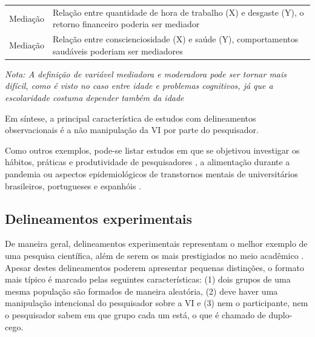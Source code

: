 \documentclass[
]{book}
\begin{document}
\begin{longtable}[]{@{}ll@{}}
\begin{minipage}[t]{0.10\columnwidth}\raggedright
Mediação\strut
\end{minipage} & \begin{minipage}[t]{0.84\columnwidth}\raggedright
Relação entre quantidade de hora de trabalho (X) e desgaste (Y), o retorno financeiro poderia ser mediador\strut
\end{minipage}\tabularnewline
\begin{minipage}[t]{0.10\columnwidth}\raggedright
Mediação\strut
\end{minipage} & \begin{minipage}[t]{0.84\columnwidth}\raggedright
Relação entre conscienciosidade (X) e saúde (Y), comportamentos saudáveis poderiam ser mediadores\strut
\end{minipage}\tabularnewline
\bottomrule
\end{longtable}

\emph{Nota: A definição de variável mediadora e moderadora pode ser tornar mais difícil, como é visto no caso entre idade e problemas cognitivos, já que a escolaridade costuma depender também da idade}

Em síntese, a principal característica de estudos com delineamentos observacionais é a não manipulação da VI por parte do pesquisador.

Como outros exemplos, pode-se listar estudos em que se objetivou investigar os hábitos, práticas e produtividade de pesquisadores \citep{Wenke2017}, a alimentação durante a pandemia \citep{Amatori2020} ou aspectos epidemiológicos de transtornos mentais de universitários brasileiros, portugueses e espanhóis \citep{AfonsoJunior2020}.

\hypertarget{delineamentos-experimentais}{%
\subsection{Delineamentos experimentais}\label{delineamentos-experimentais}}

De maneira geral, delineamentos experimentais representam o melhor exemplo de uma pesquisa científica, além de serem os mais prestigiados no meio acadêmico \citep{gil2002}. Apesar destes delineamentos poderem apresentar pequenas distinções, o formato mais típico é marcado pelas seguintes características: (1) dois grupos de uma mesma população são formados de maneira aleatória, (2) deve haver uma manipulação intencional do pesquisador sobre a VI e (3) nem o participante, nem o pesquisador sabem em que grupo cada um está, o que é chamado de duplo-cego.
\end{document}

